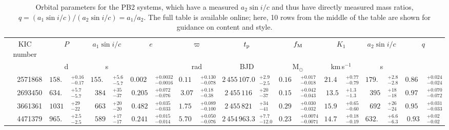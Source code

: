 \documentclass[a4paper,fleqn,usenatbib]{mnras}
\begin{document}
\begin{table*}
\centering
\caption{Orbital parameters for the PB2 systems, which have a measured $a_2 \sin i / c$ and thus have directly measured mass ratios, $q = (a_1 \sin i / c) / (a_2 \sin i / c) = a_1 / a_2$. The full table is available online; here, 10 rows from the middle of the table are shown for guidance on content and style.}
\label{tab:orbit2}
\begin{tabular}{r r@{}l r@{}l r@{}l r@{}l r@{}l r@{}l r@{}l r@{}l r@{}l}
\toprule
\multicolumn{1}{c}{KIC number} & \multicolumn{2}{c}{$P$} & \multicolumn{2}{c}{$a_1 \sin i / c$} & \multicolumn{2}{c}{$e$} & \multicolumn{2}{c}{$\varpi$} & \multicolumn{2}{c}{$t_{\rm p}$} & \multicolumn{2}{c}{$f_{\rm M}$} & \multicolumn{2}{c}{$K_1$} & \multicolumn{2}{c}{$a_2 \sin i / c$} & \multicolumn{2}{c}{$q$}\\
\multicolumn{1}{c}{} & \multicolumn{2}{c}{d} & \multicolumn{2}{c}{s} & \multicolumn{2}{c}{} & \multicolumn{2}{c}{rad} & \multicolumn{2}{c}{BJD} & \multicolumn{2}{c}{M$_{\odot}$} & \multicolumn{2}{c}{km\,s$^{-1}$} & \multicolumn{2}{c}{s} & \multicolumn{2}{c}{}\\
\midrule
\vspace{1.5mm}
2571868 & $158.1$&$^{+0.16}_{-0.17}$ & $155.3$&$^{+5.6}_{-5.7}$ & $0.0024$&$^{+0.0032}_{-0.0016}$ & $0.114$&$^{+0.130}_{-0.078}$ & $2\,455\,107.0$&$^{+2.9}_{-2.5}$ & $0.161$&$^{+0.017}_{-0.018}$ & $21.41$&$^{+0.77}_{-0.79}$ & $179.1$&$^{+2.8}_{-2.8}$ & $0.867$&$^{+0.024}_{-0.024}$ \\
\vspace{1.5mm}
2693450 & $634.1$&$^{+5.7}_{-5.7}$ & $384$&$^{+35}_{-37}$ & $0.205$&$^{+0.072}_{-0.076}$ & $3.07$&$^{+0.18}_{-0.38}$ & $2\,455\,116$&$^{+20}_{-37}$ & $0.151$&$^{+0.042}_{-0.043}$ & $13.5$&$^{+1.3}_{-1.3}$ & $395$&$^{+18}_{-18}$ & $0.973$&$^{+0.070}_{-0.072}$ \\
\vspace{1.5mm}
3661361 & $1031$&$^{+29}_{-22}$ & $663$&$^{+20}_{-20}$ & $0.482$&$^{+0.035}_{-0.033}$ & $1.752$&$^{+0.089}_{-0.100}$ & $2\,455\,821$&$^{+34}_{-41}$ & $0.294$&$^{+0.030}_{-0.032}$ & $15.99$&$^{+0.65}_{-0.60}$ & $692$&$^{+26}_{-24}$ & $0.957$&$^{+0.031}_{-0.033}$ \\
\vspace{1.5mm}
4471379 & $965.2$&$^{+2.5}_{-2.5}$ & $589$&$^{+17}_{-17}$ & $0.241$&$^{+0.015}_{-0.014}$ & $5.706$&$^{+0.050}_{-0.076}$ & $2\,454\,963.3$&$^{+7.7}_{-12.0}$ & $0.236$&$^{+0.0074}_{-0.0071}$ & $14.73$&$^{+0.18}_{-0.19}$ & $632.6$&$^{+6.6}_{-6.3}$ & $0.93$&$^{+0.02}_{-0.02}$ \\

\end{tabular}
\end{table*}
\end{document}
